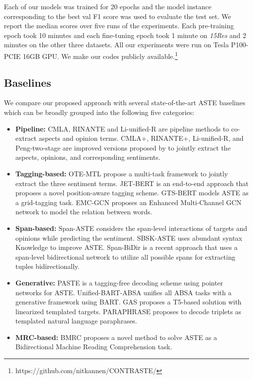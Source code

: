 Each of our models was trained for 20 epochs and the model instance corresponding to the best val F1 score was used to evaluate the test set. 
We report the median scores over five runs of the experiments. 
Each pre-training epoch took 10 minutes and each fine-tuning epoch took 1 minute on \textit{15Res} and 2 minutes on the other three datasets. 
All our experiments were run on Tesla P100-PCIE 16GB GPU. 
We make our codes publicly available.\footnote{https://github.com/nitkannen/CONTRASTE/}

\subsection{Baselines}
We compare our proposed approach with several state-of-the-art ASTE baselines which can be broadly grouped into the following five categories: 
\begin{itemize}[nosep, leftmargin=*]
    \item \textbf{Pipeline:} CMLA, RINANTE \cite{dai-song-2019-neural} and Li-unified-R \cite{li2019unified} are pipeline methods to co-extract aspects and opinion terms. CMLA+, RINANTE+, Li-unified-R, and Peng-two-stage are improved versions proposed by \cite{Peng2020KnowingWH} to jointly extract the aspects, opinions, and corresponding sentiments. 

    \item \textbf{Tagging-based:} OTE-MTL \cite{zhang-etal-2020-multi-task} propose a multi-task framework to jointly extract the three sentiment terms. JET-BERT \cite{xu-etal-2020-position} is an end-to-end approach that proposes a novel position-aware tagging scheme. GTS-BERT \cite{wu-etal-2020-grid} models ASTE as a grid-tagging task. EMC-GCN \cite{chen-etal-2022-enhanced} proposes an Enhanced Multi-Channel GCN network to model the relation between words.

    \item \textbf{Span-based:} Span-ASTE \cite{xu-etal-2021-learning} considers the span-level interactions of targets and opinions while predicting the sentiment. SBSK-ASTE \cite{Feng2022} uses abundant syntax Knowledge to improve ASTE. Span-BiDir \cite{span-bidir-emnlp2022} is a recent approach that uses a span-level bidirectional network to utilize all possible spans for extracting tuples bidirectionally.

    \item \textbf{Generative:} PASTE \cite{mukherjee-etal-2021-paste} is a tagging-free decoding scheme using pointer networks for ASTE. Unified-BART-ABSA \cite{yan-etal-2021-unified} unifies all ABSA tasks with a generative framework using BART. GAS \cite{zhang-etal-2021-towards-generative} proposes a T5-based solution with linearized templated targets. PARAPHRASE \cite{zhang-etal-2021-aspect-sentiment} proposes to decode triplets as templated natural language paraphrases. 

    \item \textbf{MRC-based:} BMRC \cite{bmrc} proposes a novel method to solve ASTE as a Bidirectional Machine Reading Comprehension task. 

\end{itemize}

